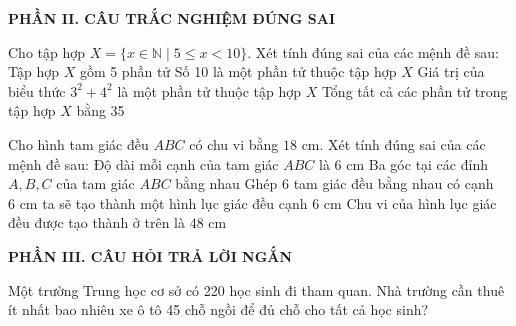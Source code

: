 \documentclass[12pt,a4paper]{article}
\begin{document}
\setcounter{ex}{0}
\noindent\textbf{\large PHẦN II. CÂU TRẮC NGHIỆM ĐÚNG SAI}
\vspace{1mm}
\begin{ex}
Cho tập hợp $X = \{x \in \mathbb{N} \mid 5 \le x < 10\}$. Xét tính đúng sai của các mệnh đề sau:
\choiceTF
{\True Tập hợp $X$ gồm 5 phần tử}
{Số 10 là một phần tử thuộc tập hợp $X$}
{Giá trị của biểu thức $3^2 + 4^2$ là một phần tử thuộc tập hợp $X$}
{\True Tổng tất cả các phần tử trong tập hợp $X$ bằng 35}
\end{ex}

\begin{ex}
Cho hình tam giác đều $ABC$ có chu vi bằng $18\text{ cm}$. Xét tính đúng sai của các mệnh đề sau:
\choiceTF
{\True Độ dài mỗi cạnh của tam giác $ABC$ là $6\text{ cm}$}
{\True Ba góc tại các đỉnh $A, B, C$ của tam giác $ABC$ bằng nhau}
{\True Ghép 6 tam giác đều bằng nhau có cạnh $6\text{ cm}$ ta sẽ tạo thành một hình lục giác đều cạnh $6\text{ cm}$}
{Chu vi của hình lục giác đều được tạo thành ở trên là $48\text{ cm}$}
\end{ex}


\setcounter{ex}{0}
\noindent\textbf{\large PHẦN III. CÂU HỎI TRẢ LỜI NGẮN}
\vspace{1mm}
\begin{ex}
Một trường Trung học cơ sở có 220 học sinh đi tham quan. Nhà trường cần thuê ít nhất bao nhiêu xe ô tô 45 chỗ ngồi để đủ chỗ cho tất cả học sinh? 
\end{ex}
\end{document}
